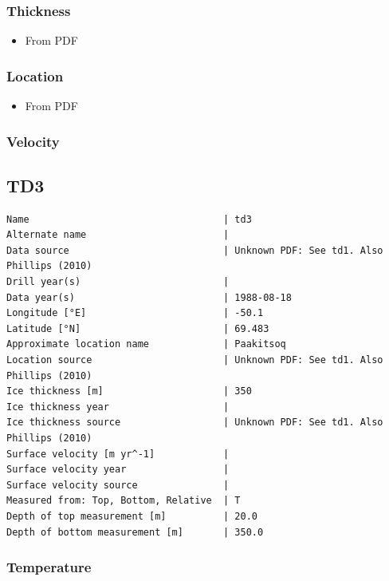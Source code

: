 \documentclass[article,a4paper,times,11pt,twoside]{article}
\begin{document}
\subsubsection{Thickness}
\label{sec:org7440500}

\begin{itemize}
\item From PDF
\end{itemize}

\subsubsection{Location}
\label{sec:org99516ff}

\begin{itemize}
\item From PDF
\end{itemize}

\subsubsection{Velocity}
\label{sec:org943639b}
\clearpage
\subsection{TD3}
\label{sec:org7ea2183}
\begin{verbatim}
Name                                  | td3
Alternate name                        | 
Data source                           | Unknown PDF: See td1. Also Phillips (2010)
Drill year(s)                         | 
Data year(s)                          | 1988-08-18
Longitude [°E]                        | -50.1
Latitude [°N]                         | 69.483
Approximate location name             | Paakitsoq
Location source                       | Unknown PDF: See td1. Also Phillips (2010)
Ice thickness [m]                     | 350
Ice thickness year                    | 
Ice thickness source                  | Unknown PDF: See td1. Also Phillips (2010)
Surface velocity [m yr^-1]            | 
Surface velocity year                 | 
Surface velocity source               | 
Measured from: Top, Bottom, Relative  | T
Depth of top measurement [m]          | 20.0
Depth of bottom measurement [m]       | 350.0
\end{verbatim}

\subsubsection{Temperature}
\label{sec:org351968c}
\end{document}

